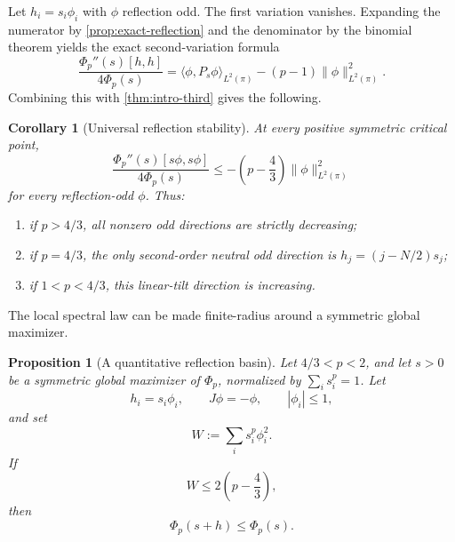 \documentclass[11pt,reqno]{amsart}
\numberwithin{equation}{section}
\newtheorem{proposition}[proposition]{Proposition}
\newtheorem{corollary}[corollary]{Corollary}
\theoremstyle{definition}
\theoremstyle{remark}
\newcommand{\norm}[1]{\lVert #1\rVert}
\newcommand{\ip}[2]{\langle #1,#2\rangle}
\begin{document}
Let $h_i=s_i\phi_i$ with $\phi$ reflection odd.  The first variation
vanishes.  Expanding the numerator by \cref{prop:exact-reflection} and the
denominator by the binomial theorem yields the exact second-variation
formula
\begin{equation}\label{eq:Hessian-formula}
  \frac{\Phi_p''(s)[h,h]}{4\Phi_p(s)}
  =\ip{\phi}{P_s\phi}_{L^2(\pi)}
  -(p-1)\norm\phi_{L^2(\pi)}^2.
\end{equation}
Combining this with \cref{thm:intro-third} gives the following.

\begin{corollary}[Universal reflection stability]\label{cor:reflection-stability}
At every positive symmetric critical point,
\begin{equation}\label{eq:reflection-gap}
  \frac{\Phi_p''(s)[s\phi,s\phi]}{4\Phi_p(s)}
  \le-\left(p-\frac43\right)\norm\phi_{L^2(\pi)}^2
\end{equation}
for every reflection-odd $\phi$.  Thus:
\begin{enumerate}[label=\textup{(\roman*)}]
  \item if $p>4/3$, all nonzero odd directions are strictly decreasing;
  \item if $p=4/3$, the only second-order neutral odd direction is
  $h_j=(j-N/2)s_j$;
  \item if $1<p<4/3$, this linear-tilt direction is increasing.
\end{enumerate}
\end{corollary}

The local spectral law can be made finite-radius around a symmetric global
maximizer.

\begin{proposition}[A quantitative reflection basin]\label{prop:reflection-basin}
Let $4/3<p<2$, and let $s>0$ be a symmetric global maximizer of $\Phi_p$,
normalized by $\sum_i s_i^p=1$.  Let
\[
  h_i=s_i\phi_i,
  \qquad J\phi=-\phi,
  \qquad |\phi_i|\le1,
\]
and set
\begin{equation}\label{eq:W}
  W:=\sum_i s_i^p\phi_i^2.
\end{equation}
If
\begin{equation}\label{eq:basin-radius}
  W\le2\left(p-\frac43\right),
\end{equation}
then
\begin{equation}\label{eq:basin-conclusion}
  \Phi_p(s+h)\le\Phi_p(s).
\end{equation}
\end{proposition}
\end{document}
